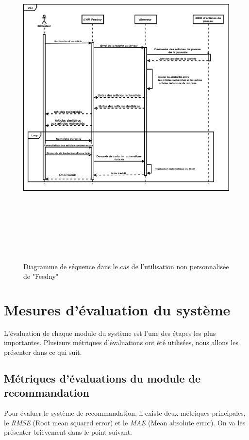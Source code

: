 \begin{figure}[H]
    \centering
    \includegraphics[height=500pt,width=425pt]{img/chapter3/diagseqnonperso.png}
    \caption{Diagramme de séquence dans le cas de l'utilisation non personnalisée de "Feedny"}
\end{figure}

\section{Mesures d'évaluation du système}
L'évaluation de chaque module du système est l'une des étapes les plus importantes. Plusieurs métriques d'évaluations ont été utilisées, nous allons les présenter dans ce qui suit.

    \subsection{Métriques d'évaluations du module de recommandation}
    Pour évaluer le système de recommandation, il existe deux métriques principales, le \emph{RMSE} (Root mean squared error) et le \emph{MAE} (Mean absolute error). On va les présenter brièvement dans le point suivant. 

